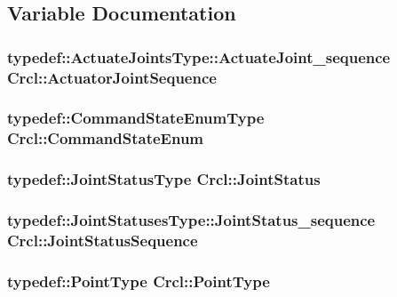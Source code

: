 \subsection{Variable Documentation}
\hypertarget{namespaceCrcl_af084766e8e2d38a135cc67ef54d9904d}{
\subsubsection[{Actuator\-Joint\-Sequence}]{\setlength{\rightskip}{0pt plus 5cm}typedef\-::\-Actuate\-Joints\-Type\-::\-Actuate\-Joint\-\_\-sequence Crcl\-::\-Actuator\-Joint\-Sequence}}\label{namespaceCrcl_af084766e8e2d38a135cc67ef54d9904d}
\hypertarget{namespaceCrcl_a5b3aa14f2f4ed63cc67ecba8eaab5c93}{
\subsubsection[{Command\-State\-Enum}]{\setlength{\rightskip}{0pt plus 5cm}typedef\-::\-Command\-State\-Enum\-Type Crcl\-::\-Command\-State\-Enum}}\label{namespaceCrcl_a5b3aa14f2f4ed63cc67ecba8eaab5c93}
\hypertarget{namespaceCrcl_a687707df3e92b0a1821bec2a0194039f}{
\subsubsection[{Joint\-Status}]{\setlength{\rightskip}{0pt plus 5cm}typedef\-::\-Joint\-Status\-Type Crcl\-::\-Joint\-Status}}\label{namespaceCrcl_a687707df3e92b0a1821bec2a0194039f}
\hypertarget{namespaceCrcl_a8e2d423195eeffb85b45b63f595f2825}{
\subsubsection[{Joint\-Status\-Sequence}]{\setlength{\rightskip}{0pt plus 5cm}typedef\-::\-Joint\-Statuses\-Type\-::\-Joint\-Status\-\_\-sequence Crcl\-::\-Joint\-Status\-Sequence}}\label{namespaceCrcl_a8e2d423195eeffb85b45b63f595f2825}
\hypertarget{namespaceCrcl_a04f09d617642257f5938e52cee2feeef}{
\subsubsection[{Point\-Type}]{\setlength{\rightskip}{0pt plus 5cm}typedef\-::\-Point\-Type Crcl\-::\-Point\-Type}}\label{namespaceCrcl_a04f09d617642257f5938e52cee2feeef}
